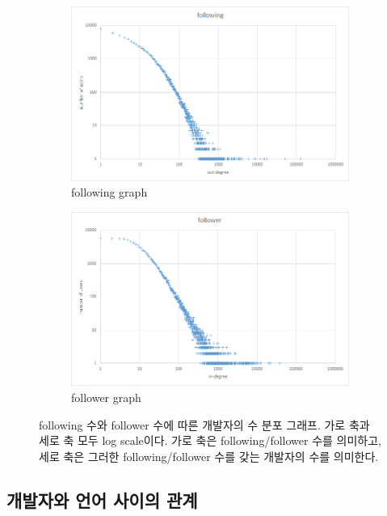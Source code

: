 \documentclass[10pt, a4paper, titlepage]{article}
\begin{document}
\begin{figure}
	\begin{subfigure}{0.99\textwidth}
		\includegraphics[width=\textwidth]{image09}
		\caption{following graph}
	\end{subfigure}

	\begin{subfigure}{0.99\textwidth}
		\includegraphics[width=\textwidth]{image13}
		\caption{follower graph}
	\end{subfigure}

	\caption{following 수와 follower 수에 따른 개발자의 수 분포 그래프. 가로 축과 세로 축 모두 log scale이다. 가로 축은 following/follower 수를 의미하고, 세로 축은 그러한 following/follower 수를 갖는 개발자의 수를 의미한다.}
	\label{fig:fdist}
\end{figure}


\subsection{개발자와 언어 사이의 관계}
\end{document}
